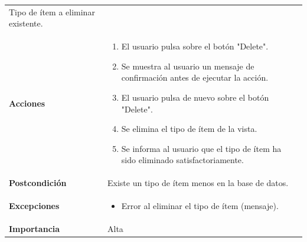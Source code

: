 \documentclass[
]{article}
\providecommand{\tightlist}{%
  \setlength{\itemsep}{0pt}\setlength{\parskip}{0pt}}
\begin{document}
\begin{longtable}[]{@{}ll@{}}
\begin{minipage}[t]{0.71\columnwidth}
Tipo de ítem a eliminar existente.\strut
\end{minipage}\tabularnewline
\begin{minipage}[t]{0.23\columnwidth}\raggedright
\textbf{Acciones}\strut
\end{minipage} & \begin{minipage}[t]{0.71\columnwidth}\raggedright
\begin{enumerate}
\def\labelenumi{\arabic{enumi}.}
\tightlist
\item
  El usuario pulsa sobre el botón "Delete".
\item
  Se muestra al usuario un mensaje de confirmación antes de ejecutar la
  acción.
\item
  El usuario pulsa de nuevo sobre el botón "Delete".
\item
  Se elimina el tipo de ítem de la vista.
\item
  Se informa al usuario que el tipo de ítem ha sido eliminado
  satisfactoriamente.
\end{enumerate}\strut
\end{minipage}\tabularnewline
\begin{minipage}[t]{0.23\columnwidth}\raggedright
\textbf{Postcondición}\strut
\end{minipage} & \begin{minipage}[t]{0.71\columnwidth}\raggedright
Existe un tipo de ítem menos en la base de datos.\strut
\end{minipage}\tabularnewline
\begin{minipage}[t]{0.23\columnwidth}\raggedright
\textbf{Excepciones}\strut
\end{minipage} & \begin{minipage}[t]{0.71\columnwidth}\raggedright
\begin{itemize}
\tightlist
\item
  Error al eliminar el tipo de ítem (mensaje).
\end{itemize}\strut
\end{minipage}\tabularnewline
\begin{minipage}[t]{0.23\columnwidth}\raggedright
\textbf{Importancia}\strut
\end{minipage} & \begin{minipage}[t]{0.71\columnwidth}\raggedright
Alta\strut
\end{minipage}\tabularnewline
\bottomrule
\end{longtable}
\end{document}
